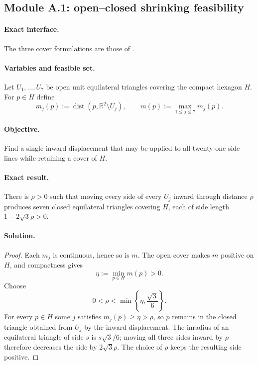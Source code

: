 \subsection{Module A.1: open--closed shrinking feasibility}

\paragraph{Exact interface.}
The three cover formulations are those of
.

\paragraph{Variables and feasible set.}
Let $U_1,\ldots,U_7$ be open unit equilateral triangles covering the compact
hexagon $H$.  For $p\in H$ define
\[
 m_j(p):=\operatorname{dist}(p,\mathbb R^2\setminus U_j),
 \qquad
 m(p):=\max_{1\le j\le7}m_j(p).
\]

\paragraph{Objective.}
Find a single inward displacement that may be applied to all twenty-one side
lines while retaining a cover of $H$.

\paragraph{Exact result.}

\begin{lemma}
\label{lem:app-open-closed-scaling}
There is $\rho>0$ such that moving every side of every $U_j$ inward through
distance $\rho$ produces seven closed equilateral triangles covering $H$,
each of side length $1-2\sqrt3\rho>0$.
\end{lemma}

\paragraph{Solution.}

\begin{proof}
Each $m_j$ is continuous, hence so is $m$.  The open cover makes $m$ positive
on $H$, and compactness gives
\[
 \eta:=\min_{p\in H}m(p)>0.
\]
Choose
\[
 0<\rho<\min\left\{\eta,\frac{\sqrt3}{6}\right\}.
\]
For every $p\in H$ some $j$ satisfies $m_j(p)\ge\eta>\rho$, so $p$ remains
in the closed triangle obtained from $U_j$ by the inward displacement.  The
inradius of an equilateral triangle of side $s$ is $s\sqrt3/6$; moving all
three sides inward by $\rho$ therefore decreases the side by
$2\sqrt3\rho$.  The choice of $\rho$ keeps the resulting side positive.
\end{proof}

